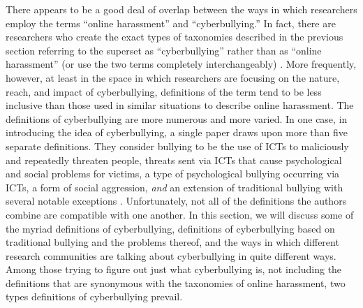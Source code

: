 \documentclass{sigchi}
\begin{document}
There appears to be a good deal of overlap between the ways in which researchers employ the terms ``online harassment'' and ``cyberbullying.''  In fact, there are researchers who create the exact types of taxonomies described in the previous section referring to the superset as ``cyberbullying'' rather than as ``online harassment'' (or use the two terms completely interchangeably) \cite{Lenhart2007Cyberbullying}.  More frequently, however, at least in the space in which researchers are focusing on the nature, reach, and impact of cyberbullying, definitions of the term tend to be less inclusive than those used in similar situations to describe online harassment.  The definitions of cyberbullying are more numerous and more varied.  In one case, in introducing the idea of cyberbullying, a single paper draws upon more than five separate definitions.  They consider bullying to be the use of ICTs to maliciously and repeatedly threaten people, threats sent via ICTs that cause psychological and social problems for victims, a type of psychological bullying occurring via ICTs, a form of social aggression, \textit{and} an extension of traditional bullying with several notable exceptions \cite{Cetin2011Cyber}.  Unfortunately, not all of the definitions the authors combine are compatible with one another.  In this section, we will discuss some of the myriad definitions of cyberbullying, definitions of cyberbullying based on traditional bullying and the problems thereof, and the ways in which different research communities are talking about cyberbullying in quite different ways.  Among those trying to figure out just what cyberbullying is, not including the definitions that are synonymous with the taxonomies of online harassment, two types definitions of cyberbullying prevail.
\end{document}
